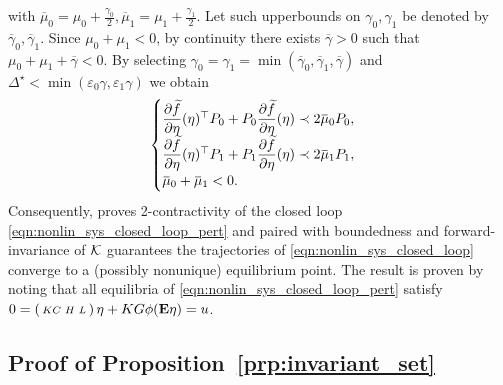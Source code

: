 \documentclass{ifacconf}
\begin{document}
with $ \overbar \mu_0 = \mu_0+\frac{\gamma_0}2, \overbar \mu_1 = \mu_1+\frac{\gamma_1}2$. Let such upperbounds on $\gamma_0,\gamma_1$ be denoted by $\overbar \gamma_0, \overbar \gamma_1$. Since $\mu_0+\mu_1<0$, by continuity there exists $\overbar \gamma>0$ such that  $\mu_0+\mu_1+\overbar \gamma<0$. By selecting $ \gamma_0=\gamma_1 = \min(\overbar \gamma_0, \overbar \gamma_1, \overbar \gamma)$ and  $\Delta^\star < \min(\varepsilon_0 \gamma, \varepsilon_1  \gamma)$ we obtain 
\[
\begin{cases}
    \pderiv{\widetilde f}{\eta}(\eta)^\top P_0 +  P_0 \pderiv{\widetilde f}{\eta}(\eta) \prec 2\overbar \mu_0 P_0,\\
     \pderiv{\widetilde f}{\eta}(\eta)^\top P_1 +  P_1 \pderiv{\widetilde f}{\eta}(\eta) \prec 2\overbar \mu_1 P_1,\\
     \overbar \mu_0 + \overbar \mu_1<0.
\end{cases}
\]
Consequently, \citep[Theorem 5]{cecilia2023generalized} proves 2-contractivity of the closed loop \eqref{eqn:nonlin_sys_closed_loop_pert} and \citep[Theorem 2.5]{Michael1995} paired with boundedness and forward- invariance of ${\mathcal{K}}$ guarantees the trajectories of \eqref{eqn:nonlin_sys_closed_loop} converge to a (possibly nonunique) equilibrium point. The result is proven by noting that all equilibria of \eqref{eqn:nonlin_sys_closed_loop_pert} satisfy $0=\left(\begin{smallmatrix} KC &H& L \end{smallmatrix} \right)\eta + KG \phi({\bf{E}} \eta)=u$. 

\subsection{Proof of Proposition~\ref{prp:invariant_set}} \label{sec:proof_prp2}
\end{document}
